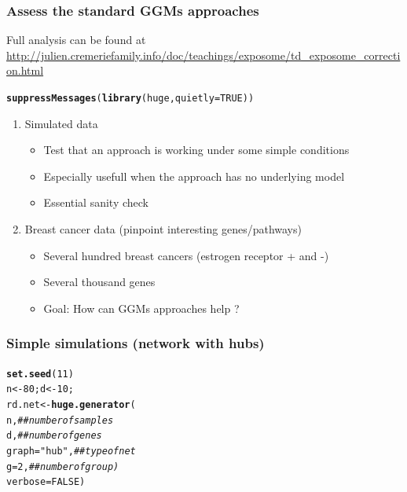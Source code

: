 \documentclass[10pt, c, xcolor=x11names]{beamer}\usepackage[]{graphicx}\usepackage[]{color}
\makeatletter
\newcommand{\hlnum}[1]{\textcolor[rgb]{0.686,0.059,0.569}{#1}}%
\newcommand{\hlstr}[1]{\textcolor[rgb]{0.192,0.494,0.8}{#1}}%
\newcommand{\hlcom}[1]{\textcolor[rgb]{0.678,0.584,0.686}{\textit{#1}}}%
\newcommand{\hlstd}[1]{\textcolor[rgb]{0.345,0.345,0.345}{#1}}%
\newcommand{\hlkwb}[1]{\textcolor[rgb]{0.69,0.353,0.396}{#1}}%
\newcommand{\hlkwc}[1]{\textcolor[rgb]{0.333,0.667,0.333}{#1}}%
\newcommand{\hlkwd}[1]{\textcolor[rgb]{0.737,0.353,0.396}{\textbf{#1}}}%
\newenvironment{kframe}{%
 \def\at@end@of@kframe{}%
 \ifinner\ifhmode%
  \def\at@end@of@kframe{\end{minipage}}%
  \begin{minipage}{\columnwidth}%
 \fi\fi%
 \def\FrameCommand##1{\hskip\@totalleftmargin \hskip-\fboxsep
 \colorbox{shadecolor}{##1}\hskip-\fboxsep
     \hskip-\linewidth \hskip-\@totalleftmargin \hskip\columnwidth}%
 \MakeFramed {\advance\hsize-\width
   \@totalleftmargin\z@ \linewidth\hsize
   \@setminipage}}%
 {\par\unskip\endMakeFramed%
 \at@end@of@kframe}
\newenvironment{knitrout}{}{} %
\makeatother
\begin{document}
\begin{frame}[fragile]
  \frametitle{Assess the standard GGMs approaches}

Full analysis can be found at \url{http://julien.cremeriefamily.info/doc/teachings/exposome/td_exposome_correction.html}

\begin{knitrout}\scriptsize
{}\color{fgcolor}\begin{kframe}
\begin{alltt}
\hlkwd{suppressMessages}\hlstd{(}\hlkwd{library}\hlstd{(huge,} \hlkwc{quietly} \hlstd{=} \hlnum{TRUE}\hlstd{))}
\end{alltt}
\end{kframe}
\end{knitrout}

\begin{enumerate}
\item Simulated data
\begin{itemize}
    \item Test that an approach is working under some simple conditions
    \item Especially usefull when the approach has no underlying model
    \item Essential sanity check
\end{itemize}
\item Breast cancer data (pinpoint interesting genes/pathways)
\begin{itemize}
    \item Several hundred breast cancers (estrogen receptor + and -)
    \item Several thousand genes 
    \item Goal: How can GGMs approaches help ? 
\end{itemize}
\end{enumerate}

\end{frame}

\begin{frame}[fragile]
  \frametitle{Simple simulations (network with hubs)}

\begin{knitrout}\scriptsize
{}\color{fgcolor}\begin{kframe}
\begin{alltt}
\hlkwd{set.seed}\hlstd{(}\hlnum{11}\hlstd{)}
\hlstd{n} \hlkwb{<-} \hlnum{80}\hlstd{; d} \hlkwb{<-} \hlnum{10}\hlstd{;}
\hlstd{rd.net}  \hlkwb{<-} \hlkwd{huge.generator}\hlstd{(}
  \hlstd{n,} \hlcom{## number of samples}
  \hlstd{d,} \hlcom{## number of genes}
  \hlkwc{graph}\hlstd{=}\hlstr{"hub"}\hlstd{,} \hlcom{## type of net}
  \hlkwc{g} \hlstd{=} \hlnum{2}\hlstd{,} \hlcom{## number of group)}
  \hlkwc{verbose}\hlstd{=}\hlnum{FALSE}\hlstd{)}
\end{alltt}
\end{kframe}
\end{knitrout}

\end{frame}
\end{document}
